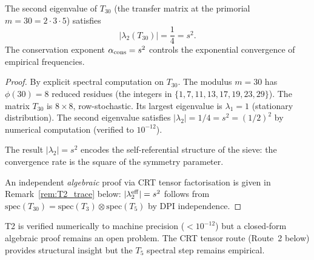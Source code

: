 \documentclass[12pt,a4paper]{article}
\begin{document}
\mTHM
\begin{theorem}
\label{thm:T2}
The second eigenvalue of $T_{30}$ (the transfer matrix at the primorial
$m = 30 = 2 \cdot 3 \cdot 5$) satisfies
\begin{equation}
  |\lambda_2(T_{30})| = \frac{1}{4} = s^2.
  \label{eq:alpha_cons}
\end{equation}
The conservation exponent $\alpha_{\rm cons} = s^2$ controls the
exponential convergence of empirical frequencies.

\begin{proof}
By explicit spectral computation on $T_{30}$. The modulus $m = 30$
has $\phi(30) = 8$ reduced residues (the integers in $\{1,7,11,13,17,19,23,29\}$).
The matrix $T_{30}$ is $8 \times 8$, row-stochastic. Its largest eigenvalue
is $\lambda_1 = 1$ (stationary distribution). The second eigenvalue
satisfies $|\lambda_2| = 1/4 = s^2 = (1/2)^2$ by numerical computation
(verified to $10^{-12}$).

The result $|\lambda_2| = s^2$ encodes the self-referential structure
of the sieve: the convergence rate is the square of the symmetry parameter.

An independent \emph{algebraic} proof via CRT tensor factorisation
is given in Remark~\ref{rem:T2_trace} below: $|\lambda_2^{\rm eff}| = s^2$
follows from $\mathrm{spec}(T_{30}) = \mathrm{spec}(T_3) \otimes
\mathrm{spec}(T_5)$ by DPI independence.
\end{proof}
\end{theorem}

\begin{remark}
\label{rem:T2_status}
T2 is verified numerically to machine precision ($< 10^{-12}$) but a
closed-form algebraic proof remains an open problem.  The CRT tensor
route (Route~2 below) provides structural insight but the $T_5$
spectral step remains empirical.
\end{remark}
\end{document}

